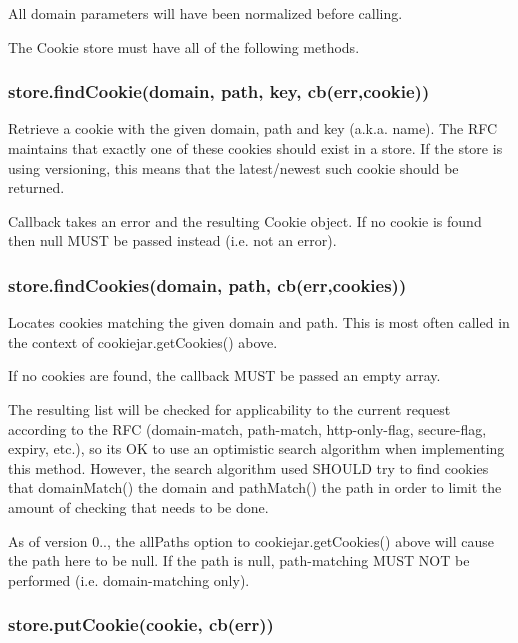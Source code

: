 All {\ttfamily domain} parameters will have been normalized before calling.

The Cookie store must have all of the following methods.

\subsubsection*{{\ttfamily store.\+find\+Cookie(domain, path, key, cb(err,cookie))}}

Retrieve a cookie with the given domain, path and key (a.\+k.\+a. name). The R\+FC maintains that exactly one of these cookies should exist in a store. If the store is using versioning, this means that the latest/newest such cookie should be returned.

Callback takes an error and the resulting {\ttfamily Cookie} object. If no cookie is found then {\ttfamily null} M\+U\+ST be passed instead (i.\+e. not an error).

\subsubsection*{{\ttfamily store.\+find\+Cookies(domain, path, cb(err,cookies))}}

Locates cookies matching the given domain and path. This is most often called in the context of {\ttfamily cookiejar.\+get\+Cookies()} above.

If no cookies are found, the callback M\+U\+ST be passed an empty array.

The resulting list will be checked for applicability to the current request according to the R\+FC (domain-\/match, path-\/match, http-\/only-\/flag, secure-\/flag, expiry, etc.), so it\textquotesingle{}s OK to use an optimistic search algorithm when implementing this method. However, the search algorithm used S\+H\+O\+U\+LD try to find cookies that {\ttfamily domain\+Match()} the domain and {\ttfamily path\+Match()} the path in order to limit the amount of checking that needs to be done.

As of version 0.., the {\ttfamily all\+Paths} option to {\ttfamily cookiejar.\+get\+Cookies()} above will cause the path here to be {\ttfamily null}. If the path is {\ttfamily null}, path-\/matching M\+U\+ST N\+OT be performed (i.\+e. domain-\/matching only).

\subsubsection*{{\ttfamily store.\+put\+Cookie(cookie, cb(err))}}

